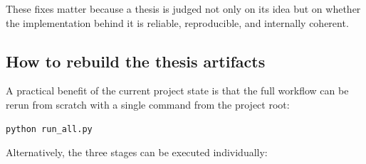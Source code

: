 These fixes matter because a thesis is judged not only on its idea but on whether the implementation behind it is reliable, reproducible, and internally coherent.

\subsection{How to rebuild the thesis artifacts}

A practical benefit of the current project state is that the full workflow can be rerun from scratch with a single command from the project root:

\begin{lstlisting}[language={}, caption={Full rebuild from the project root directory.}, label=lst:rebuild]
python run_all.py
\end{lstlisting}

Alternatively, the three stages can be executed individually:

